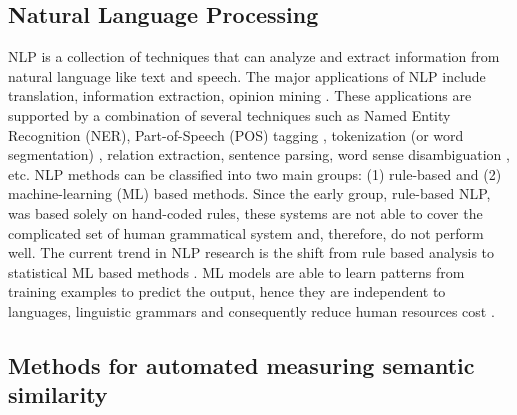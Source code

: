 \documentclass[Journal, InsideFigs, DoubleSpace]{ascelike} %
\begin{document}
\subsection{Natural Language Processing}
NLP is a collection of techniques that can analyze and extract information from natural language like text and speech. The major applications of NLP include translation, information extraction, opinion mining \cite{Cambria14}. These applications are supported by a combination of several techniques such as Named Entity Recognition (NER), Part-of-Speech (POS) tagging \cite{Toutanova03,Cunningham02}, tokenization (or word segmentation) \cite{Webster92,Zhao11}, relation extraction, sentence parsing, word sense disambiguation \cite{Lesk86,Yarowsky95,Navigli09}, etc. NLP methods can be classified into two main groups: (1) rule-based and (2) machine-learning (ML) based methods. Since the early group, rule-based NLP, was based solely on hand-coded rules, these systems are not able to cover the complicated set of human grammatical system \cite{Marcus95} and, therefore, do not perform well. The current trend in NLP research is the shift from rule based analysis to statistical ML based methods \cite{Cambria14}. ML models are able to learn patterns from training examples to predict the output, hence they are independent to languages, linguistic grammars and consequently reduce human resources cost \cite{costa-jussa12}. 

\subsection{Methods for automated measuring semantic similarity}
\end{document}

